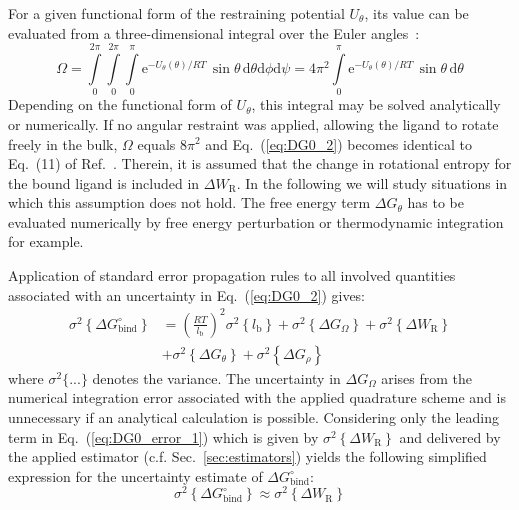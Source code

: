 \documentclass[9pt,lessons,pubversion]{livecoms}
\begin{document}
For a given functional form of the restraining potential $U_\theta$, its value can be evaluated from a three-dimensional integral over the Euler angles~\cite{hermans1997inclusion, steinberg1963entropy}:
\begin{equation}
\Omega = \int\limits_{0}^{2 \pi}\int\limits_{0}^{2 \pi}\int\limits_{0}^{\pi} \mathrm{e}^{- U_\theta(\theta)/RT} \, \sin\theta \, \mathrm{d}\theta \mathrm{d}\phi \mathrm{d}\psi
              = 4 \pi^2  \int\limits_{0}^{\pi} \mathrm{e}^{- U_\theta(\theta)/RT} \, \sin\theta \, \mathrm{d}\theta
\label{eq:Omega}
\end{equation}
Depending on the functional form of $U_\theta$, this integral may be solved analytically or numerically.
If no angular restraint was applied, allowing the ligand to rotate freely in the bulk, $\Omega$ equals $8 \pi^2$ and Eq.~(\ref{eq:DG0_2}) becomes identical to Eq.~(11) of Ref.~. 
Therein, it is assumed that the change in rotational entropy for the bound ligand is included in $\Delta W_\mathrm{R}$.
In the following we will study situations in which this assumption does not hold.
The free energy term $\Delta G_\theta$ has to be evaluated numerically by free energy perturbation or thermodynamic integration for example.

Application of standard error propagation rules to all involved quantities associated with an uncertainty in Eq.~(\ref{eq:DG0_2}) gives:
\begin{equation}
\begin{split}
\sigma^2 \left\{\Delta G^\circ_\mathrm{bind} \right\}  & = \left(  \frac{RT}{l_\mathrm{b} } \right)^2 \sigma^2 \left \{ l_\mathrm{b} \right \} + \sigma^2 \left\{ \Delta G_\Omega \right\} + \sigma^2 \left \{ \Delta W_\mathrm{R} \right \} \\\
& + \sigma^2 \left\{ \Delta G_\theta \right\} + \sigma^2 \left\{ \Delta G_\rho \right\} 
\end{split}
\label{eq:DG0_error_1}
\end{equation}
where $\sigma^2 \{...\}$ denotes the variance. 
The uncertainty in $\Delta G_\Omega$ arises from the numerical integration error associated with the applied quadrature scheme and is unnecessary if an analytical calculation is possible. 
Considering only the leading term in Eq.~(\ref{eq:DG0_error_1}) which is given by $\sigma^2 \left \{ \Delta W_\mathrm{R} \right \}$ and delivered by the applied estimator (c.f. Sec.~\ref{sec:estimators})  
yields the following simplified expression for the uncertainty estimate of $\Delta G^\circ_\mathrm{bind}$:
\begin{equation}
\sigma^2 \left\{\Delta G^\circ_\mathrm{bind} \right\}  \approx \sigma^2 \left \{ \Delta W_\mathrm{R} \right \}
\label{eq:DG0_error_2}
\end{equation}
\end{document}
